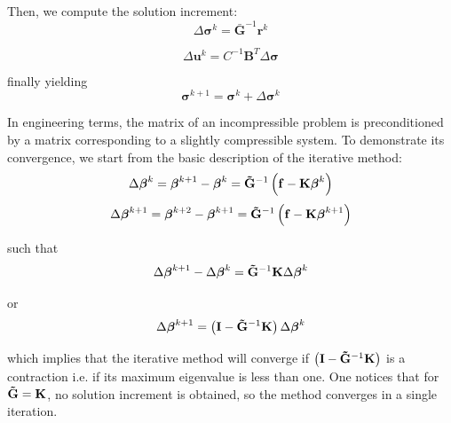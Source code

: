 \documentclass{wccm2024}
\begin{document}
\noindent Then, we compute the solution increment:
\vskip -0.3cm
\begin{equation}
    \Delta\boldsymbol{\sigma}^k = \mathbf{\bar{G}}^{-1} \mathbf{r}^{k}
\end{equation}

\begin{equation}
\Delta \mathbf{u}^k = C^{-1}\mathbf{B}^T\Delta \boldsymbol{\sigma}
\end{equation}

\noindent finally yielding
\vskip -0.3cm
\begin{equation}
    \boldsymbol{\sigma}^{k+1} = \boldsymbol{\sigma}^{k} + \Delta\boldsymbol{\sigma}^k
\end{equation}

In engineering terms, the matrix of an incompressible problem is preconditioned by a matrix corresponding to a slightly compressible system. To demonstrate its convergence, we start from the basic description of the iterative method:
\vskip -0.3cm
\begin{equation}
    \Delta\boldsymbol{\beta}^{k} = \boldsymbol{\beta}^{k+1} - \boldsymbol{\beta}^{k} = \mathbf{\Tilde{G}}^{-1} \left( \mathbf{f} - \mathbf{K} \boldsymbol{\beta}^k \right)
\end{equation}
\vskip -0.3cm
\begin{equation}
    \Delta\boldsymbol{\beta}^{k+1} = \boldsymbol{\beta}^{k+2} - \boldsymbol{\beta}^{k+1} = \mathbf{\Tilde{G}}^{-1} \left( \mathbf{f} - \mathbf{K} \boldsymbol{\beta}^{k+1} \right)
\end{equation}

\noindent such that
\vskip -0.3cm
\begin{equation}
    \Delta\boldsymbol{\beta}^{k+1} - \Delta\boldsymbol{\beta}^{k} = \mathbf{\Tilde{G}}^{-1} \mathbf{K} \Delta\boldsymbol{\beta}^{k}
\end{equation}

\noindent or
\vskip -0.3cm
\begin{equation}
    \Delta\boldsymbol{\beta}^{k+1} = \left( \mathbf{I} - \mathbf{\Tilde{G}}^{-1} \mathbf{K} \right) \Delta\boldsymbol{\beta}^{k}
\end{equation}

\noindent which implies that the iterative method will converge if $\left( \mathbf{I} - \mathbf{\Tilde{G}}^{-1} \mathbf{K} \right)$ is a contraction i.e. if its maximum eigenvalue is less than one. One notices that for $\mathbf{\Tilde{G}} = \mathbf{K}$, no solution increment is obtained, so the method converges in a single iteration.
\end{document}
